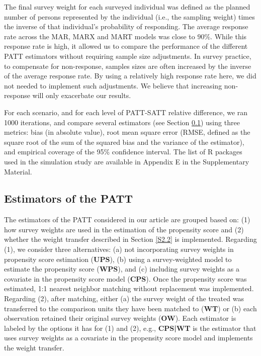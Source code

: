 \documentclass[oupdraft]{bio}
\begin{document}
The final survey weight for each surveyed individual was defined as the planned number of persons represented by the individual (i.e., the sampling weight) times the inverse of that individual's probability of responding. The average response rate across the MAR, MARX and MART models was close to $90\%$. While this response rate is high, it allowed us to compare the performance of the different PATT estimators without requiring sample size adjustments.  In survey practice, to compensate for non-response, samples sizes are often increased by the inverse of the average response rate. By using a relatively high response rate here, we did not needed to implement such adjustments. We believe that increasing non-response will only exacerbate our results.   

For each scenario, and for each level of PATT-SATT relative difference, we ran 1000 iterations, and compare several estimators (see Section \ref{S3.1}) using three metrics: bias (in absolute value), root mean square error (RMSE, defined as the square root of the sum of the squared bias and the variance of the estimator), and empirical coverage of the 95\% confidence interval. The list of R packages used in the simulation study are available in Appendix E in the Supplementary Material.


\subsection{Estimators of the PATT}
\label{S3.1}
The estimators of the PATT considered in our article are grouped based on: (1) how survey weights are used in the estimation of the propensity score and (2) whether the weight transfer described in Section \ref{S2.2} is implemented. 
Regarding (1), we consider three alternatives: (a) not incorporating survey weights in propensity score estimation (\textbf{UPS}), (b) using a survey-weighted model to estimate the propensity score (\textbf{WPS}), and (c) including survey weights as a covariate in the propensity score model (\textbf{CPS}). Once the propensity score was estimated, 1:1 nearest neighbor matching without replacement was implemented.  Regarding (2), after matching, either (a) the survey weight of the treated was transferred to the comparison units they have been matched to (\textbf{WT}) or (b) each observation retained their original survey weights (\textbf{OW}). Each estimator is labeled by the options it has for (1) and (2), e.g., \textbf{CPS|WT} is the estimator that uses survey weights as a covariate in the propensity score model and implements the weight transfer.
\end{document}
